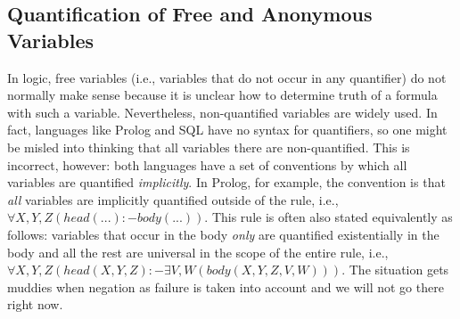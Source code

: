 \documentclass[11pt]{article}
\begin{document}
\subsection{Quantification of Free and Anonymous Variables}

In logic, free variables (i.e., variables that do not  occur in any quantifier)
do not normally make sense because
it is unclear how to determine truth of a formula with such a variable.
Nevertheless, non-quantified variables are widely used. In fact,
languages like Prolog and SQL have no syntax for quantifiers, so one might
be misled into thinking that all variables there are non-quantified.
This is incorrect, however: both languages have a set of conventions by
which all variables are quantified \emph{implicitly}. In Prolog, for
example, the convention is that \emph{all} variables are implicitly quantified  
outside of the rule, i.e., $\forall X,Y,Z (head(...) :- body(...))$.
This rule is often also stated equivalently as follows: variables that
occur in the body \emph{only} are quantified existentially in the body and all the
rest are universal in the scope of the entire rule, i.e., $\forall X,Y,Z
(head(X,Y,Z) :- \exists V,W (body(X,Y,Z,V,W)))$. The situation gets muddies
when negation as failure is taken into account and we will not go there
right now.
\end{document}
